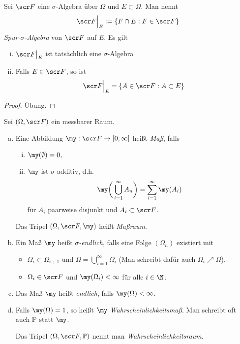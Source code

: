 \begin{nt} \label{1.1.7}
	Sei $\scr F$ eine $\sigma$-Algebra über $\Omega$ und $E \subset \Omega$.
	Man nennt
	\[
		\scr F\Big|_E := \{ F \cap E : F \in \scr F \}
	\]
	\emph{Spur-$\sigma$-Algebra} von $\scr F$ auf $E$.
	Es gilt
	\begin{enumerate}[(i)]
		\item
			$\scr F\big|_E$ ist tatsächlich eine $\sigma$-Algebra
		\item
			Falls $E \in \scr F$, so ist
			\[
				\scr F\Big|_{E} = \{ A \in \scr F : A \subset E \}
			\]
	\end{enumerate}
	\begin{proof}
		Übung.
	\end{proof}
\end{nt}

\begin{df} \label{1.1.8}
	Sei $(\Omega, \scr F)$ ein messbarer Raum.
	\begin{enumerate}[(a)]
		\item
			Eine Abbildung $\my : \scr F \to [0,\infty]$ heißt \emph{Maß}, falls
			\begin{enumerate}[(i)]
				\item
					$\my(\emptyset) = 0$,
				\item
					$\my$ ist $\sigma$-additiv, d.h.
					\[
						\my \bigg( \bigcup_{i=1}^\infty A_n \bigg)
						= \sum_{i=1}^\infty \my(A_i)
					\]
					für $A_i$ paarweise disjunkt und $A_i \subset \scr F$.
			\end{enumerate}

			Das Tripel $(\Omega, \scr F, \my)$ heißt \emph{Maßraum}.
		\item
			Ein Maß $\my$ heißt \emph{$\sigma$-endlich}, falls eine Folge $(\Omega_n)$ existiert mit
			\begin{itemize}
				\item
					$\Omega_i \subset \Omega_{i+1}$ und	$\Omega = \bigcup_{i=1}^\infty \Omega_i$
					(Man schreibt dafür auch $\Omega_i \nearrow \Omega$).
				\item
					$\Omega_i \in \scr F$ und $\my(\Omega_i) < \infty$ für alle $i \in \N$.
			\end{itemize}
		\item
			Das Maß $\my$ heißt \emph{endlich}, falls $\my(\Omega) < \infty$.
		\item
			Falls $\my(\Omega) = 1$, so heißt $\my$ \emph{Wahrscheinlichkeitsmaß}.
			Man schreibt oft auch $\P$ statt $\my$.

			Das Tripel $(\Omega, \scr F, \P)$ nennt man \emph{Wahrscheinlichkeitsraum}.
	\end{enumerate}
\end{df}

